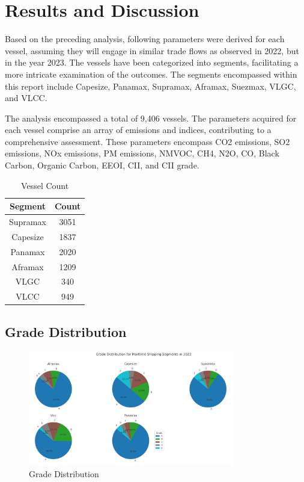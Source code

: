 \chapter{Results and Discussion}

Based on the preceding analysis, following parameters were derived for each vessel, assuming they will engage in similar trade flows as observed in 2022, but in the year 2023. 
The vessels have been categorized into segments, facilitating a more intricate examination of the outcomes. The segments encompassed within this report include Capesize, Panamax, Supramax, Aframax, Suezmax, VLGC, and VLCC.

The analysis encompassed a total of 9,406 vessels. 
The parameters acquired for each vessel comprise an array of emissions and indices, contributing to a comprehensive assessment. 
These parameters encompass CO2 emissions, SO2 emissions, NOx emissions, PM emissions, NMVOC, CH4, N2O, CO, Black Carbon, Organic Carbon, EEOI, CII, and CII grade.

\begin{table}[htbp]
    \centering
    \begin{tabular}{|c|c|}
        \hline
        \textbf{Segment} & \textbf{Count} \\
        \hline
        Supramax & 3051 \\
        Capesize & 1837 \\
        Panamax & 2020 \\
        Aframax & 1209 \\
        VLGC & 340 \\
        VLCC & 949 \\
        \hline
    \end{tabular}
    \caption{Vessel Count}
    \label{tab:segments_counts}
\end{table}

\newpage

\section{Grade Distribution}

\begin{figure}[h]
    \centering
    \includegraphics[width=0.8\textwidth]{images/grade_distribution.png}
    \caption{Grade Distribution}
    \label{grade_distribution}
\end{figure}

